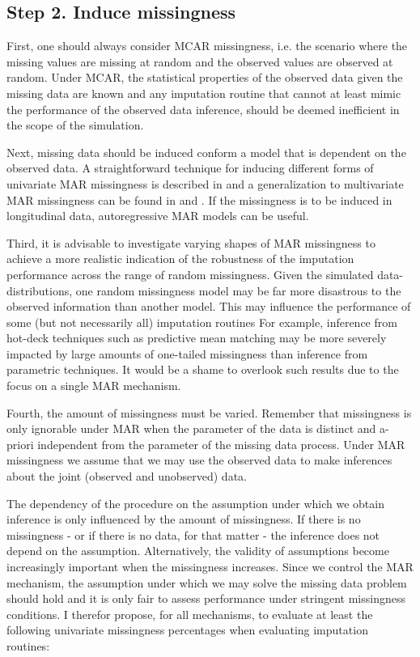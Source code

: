 \documentclass[bimj,fleqn]{w-art}
\theoremstyle{plain}
\theoremstyle{definition}
\begin{document}
\subsection{Step 2. Induce missingness}

First, one should always consider MCAR missingness, i.e. the scenario where the missing values are missing at random and the observed values are observed at random. Under MCAR, the statistical properties of the observed data given the missing data are known and any imputation routine that cannot at least mimic the performance of the observed data inference, should be deemed inefficient in the scope of the simulation.  

Next, missing data should be induced conform a model that is dependent on the observed data. A straightforward technique for inducing different forms of univariate MAR missingness is described in \citet[][p. 63]{fimd} and a generalization to multivariate MAR missingness can be found in \citet[][Appendix B]{buur06} and \citet[][\S 5.2.3]{brand1999development}. If the missingness is to be induced in longitudinal data, autoregressive MAR models \citep[e.g. cf.][model 2 and model 3]{shara2015randomly} can be useful. 

Third, it is advisable to investigate varying shapes of MAR missingness to achieve a more realistic indication of the robustness of the imputation performance across the range of random missingness. Given the simulated data-distributions, one random missingness model may be far more disastrous to the observed information than another model. This may influence the performance of some (but not necessarily all) imputation routines For example, inference from  hot-deck techniques such as predictive mean matching \citep{little1988missing, rubin1986statistical} may be more severely impacted by large amounts of one-tailed missingness than inference from parametric techniques. It would be a shame to overlook such results due to the focus on a single MAR mechanism. 

Fourth, the amount of missingness must be varied. Remember that missingness is only ignorable under MAR when the parameter of the data is distinct and a-priori independent from the parameter of the missing data process. Under MAR missingness we assume that we may use the observed data to make inferences about the joint (observed and unobserved) data. 

The dependency of the procedure on the assumption under which we obtain inference is only influenced by the amount of missingness. If there is no missingness - or if there is no data, for that matter - the inference does not depend on the assumption. Alternatively, the validity of assumptions become increasingly important when the missingness increases. Since we control the MAR mechanism, the assumption under which we may solve the missing data problem should hold and it is only fair to assess performance under stringent missingness conditions. I therefor propose, for all mechanisms, to evaluate at least the following univariate missingness percentages when evaluating imputation routines:
\end{document}
